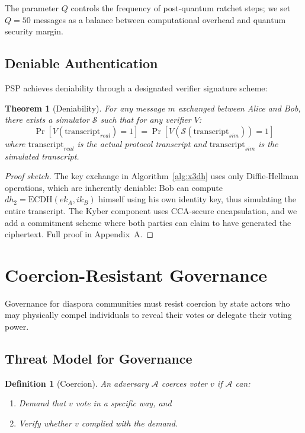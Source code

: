 \documentclass[11pt,a4paper]{article}
\newtheorem{definition}{Definition}
\newtheorem{theorem}{Theorem}
\begin{document}
The parameter $Q$ controls the frequency of post-quantum ratchet steps; we set $Q = 50$ messages as a balance between computational overhead and quantum security margin.

\subsection{Deniable Authentication}

PSP achieves deniability through a designated verifier signature scheme:

\begin{theorem}[Deniability]
For any message $m$ exchanged between Alice and Bob, there exists a simulator $\mathcal{S}$ such that for any verifier $V$:
\[
\Pr[V(\text{transcript}_{real}) = 1] = \Pr[V(\mathcal{S}(\text{transcript}_{sim})) = 1]
\]
where $\text{transcript}_{real}$ is the actual protocol transcript and $\text{transcript}_{sim}$ is the simulated transcript.
\end{theorem}

\begin{proof}[Proof sketch]
The key exchange in Algorithm~\ref{alg:x3dh} uses only Diffie-Hellman operations, which are inherently deniable: Bob can compute $dh_2 = \text{ECDH}(ek_A, ik_B)$ himself using his own identity key, thus simulating the entire transcript. The Kyber component uses CCA-secure encapsulation, and we add a commitment scheme where both parties can claim to have generated the ciphertext. Full proof in Appendix~A.
\end{proof}

\section{Coercion-Resistant Governance}
\label{sec:governance}

Governance for diaspora communities must resist coercion by state actors who may physically compel individuals to reveal their votes or delegate their voting power.

\subsection{Threat Model for Governance}

\begin{definition}[Coercion]
An adversary $\mathcal{A}$ coerces voter $v$ if $\mathcal{A}$ can:
\begin{enumerate}
    \item Demand that $v$ vote in a specific way, and
    \item Verify whether $v$ complied with the demand.
\end{enumerate}
\end{definition}
\end{document}
